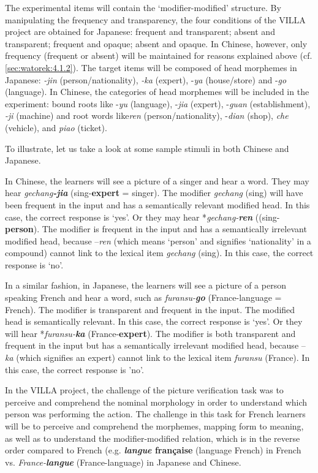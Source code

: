 \documentclass[output=paper,colorlinks,citecolor=brown,modfonts,nonflat]{../langscibook}
\begin{document}
The experimental items will contain the ‘modifier-modified’ structure. By manipulating the frequency and transparency, the four conditions of the VILLA project are obtained for Japanese: frequent and transparent; absent and transparent; frequent and opaque; absent and opaque. In Chinese, however, only frequency (frequent or absent) will be maintained for reasons explained above (cf. \ref{sec:watorek:4.1.2}). The target items will be composed of head morphemes in Japanese: \textit{{}-jin} (person/nationality), \textit{{}-ka} (expert), -\textit{ya} (house/store) and -\textit{go} (language). In Chinese, the categories of head morphemes will be included in the experiment: bound roots like {}-\textit{yu} (language), -\textit{jia} (expert), -\textit{guan} (establishment), \textit{{}-ji} (machine) and root words like\textit{ren} (person/nationality), -\textit{dian} (shop), \textit{che} (vehicle), and \textit{piao} (ticket).

To illustrate, let us take a look at some sample stimuli in both Chinese and Japanese.

In Chinese, the learners will see a picture of a singer and hear a word. They may hear \textit{gechang}\textbf{\textit{{}-jia}} (sing-\textbf{expert} = singer). The modifier \textit{gechang} (sing) will have been frequent in the input and has a semantically relevant modified head. In this case, the correct response is ‘yes’. Or they may hear *\textit{gechang-}\textbf{\textit{ren}} ((sing-\textbf{person}). The modifier is frequent in the input and has a semantically irrelevant modified head, because –\textit{ren} (which means ‘person’ and signifies ‘nationality’ in a compound) cannot link to the lexical item \textit{gechang} (sing). In this case, the correct response is ‘no’.

In a similar fashion, in Japanese, the learners will see a picture of a person speaking French and hear a word, such as \textit{furansu-}\textbf{\textit{go}} (France-language = French). The modifier is transparent and frequent in the input. The modified head is semantically relevant. In this case, the correct response is ‘yes’. Or they will hear *\textit{furansu-}\textbf{\textit{ka}} (France-\textbf{expert}). The modifier is both transparent and frequent in the input but has a semantically irrelevant modified head, because –\textit{ka} (which signifies an expert) cannot link to the lexical item \textit{furansu} (France). In this case, the correct response is 'no'.

In the VILLA project, the challenge of the picture verification task was to perceive and comprehend the nominal morphology in order to understand which person was performing the action. The challenge in this task for French learners will be to perceive and comprehend the morphemes, mapping form to meaning, as well as to understand the modifier-modified relation, which is in the reverse order compared to French (e.g. \textbf{\textit{langue} française} (language French) in French vs. \textit{France-}\textbf{\textit{langue}} (France-language) in Japanese and Chinese.
\end{document}
